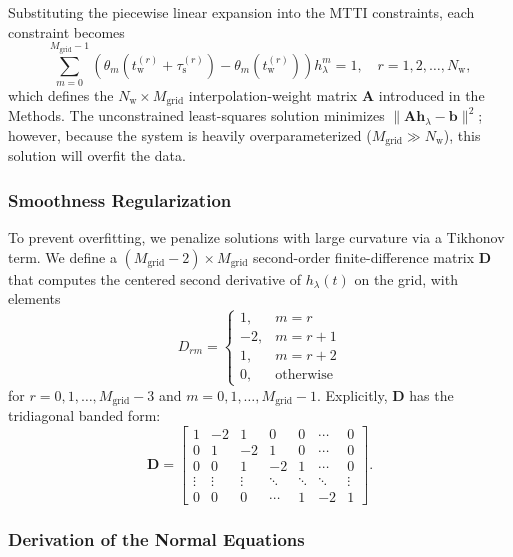 Substituting the piecewise linear expansion into the MTTI constraints, each constraint becomes
\begin{equation}
\sum_{m = 0}^{M_\mathrm{grid}-1}  \left( \theta_m(t_\mathrm{w}^{(r)} + \tau_\mathrm{s}^{(r)})  - \theta_m(t_\mathrm{w}^{(r)}) \right) h_\lambda^m= 1, \quad r = 1, 2, \ldots, N_\mathrm{w},
\label{eq:SI_constraints_set}
\end{equation}
which defines the $N_\mathrm{w} \times M_\mathrm{grid}$ interpolation-weight matrix $\mathbf{A}$ introduced in the Methods.
The unconstrained least-squares solution minimizes $\|\mathbf{A}\boldsymbol{h}_\lambda - \boldsymbol{b}\|^2$; however, because the system is heavily overparameterized ($M_\mathrm{grid} \gg N_\mathrm{w}$), this solution will overfit the data.

\subsubsection{Smoothness Regularization}

To prevent overfitting, we penalize solutions with large curvature via a Tikhonov term.
We define a $(M_\mathrm{grid}-2) \times M_\mathrm{grid}$ second-order finite-difference matrix $\mathbf{D}$ that computes the centered second derivative of $h_\lambda(t)$ on the grid, with elements
\begin{equation}
D_{rm} = 
\begin{cases}
1, & m = r \\
-2, & m = r+1 \\
1, & m = r+2 \\
0, & \text{otherwise}
\end{cases}
\end{equation}
for $r = 0, 1, \ldots, M_\mathrm{grid}-3$ and $m = 0, 1, \ldots, M_\mathrm{grid}-1$. Explicitly, $\mathbf{D}$ has the tridiagonal banded form:
\begin{equation}
\mathbf{D} = \begin{bmatrix}
1 & -2 & 1 & 0 & 0 & \cdots & 0 \\
0 & 1 & -2 & 1 & 0 & \cdots & 0 \\
0 & 0 & 1 & -2 & 1 & \cdots & 0 \\
\vdots & \vdots & \vdots & \ddots & \ddots & \ddots & \vdots \\
0 & 0 & 0 & \cdots & 1 & -2 & 1
\end{bmatrix}.
\end{equation}

\subsubsection{Derivation of the Normal Equations}


